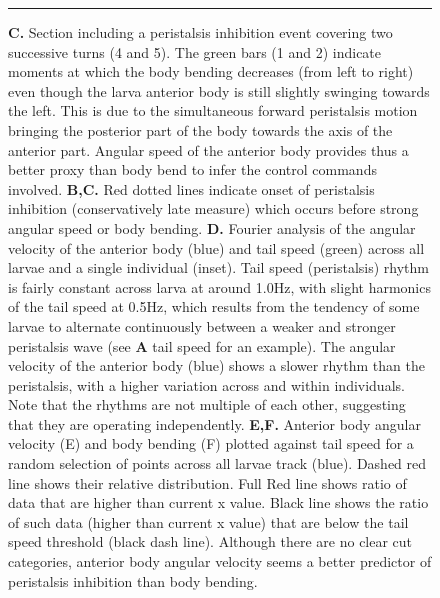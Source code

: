 \documentclass[11pt,a4paper]{article}
\newcommand{\todoBW}[1]{\todo[author=BW,color=orange, size=\tiny,inline]{#1}}
\begin{document}
\begin{figure}
\ContinuedFloat
\caption{
{\bf C.} Section including a peristalsis inhibition event covering two successive turns (4 and 5). The green bars (1 and 2) indicate moments at which the body bending decreases (from left to right) even though the larva anterior body is still slightly swinging towards the left. This is due to the simultaneous forward peristalsis motion bringing the posterior part of the body towards the axis of the anterior part. Angular speed of the anterior body provides thus a better proxy than body bend to infer the control commands involved.
 {\bf B,C.} Red dotted lines indicate onset of peristalsis inhibition (conservatively late measure) which occurs before strong angular speed or body bending. {\bf D.} Fourier analysis of the angular velocity of the anterior body (blue) and tail speed (green) across all larvae and a single individual (inset). Tail speed (peristalsis) rhythm is fairly constant across larva at around 1.0Hz, with slight harmonics of the tail speed at 0.5Hz, which results from the tendency of some larvae to alternate continuously between a weaker and stronger peristalsis wave (see {\bf A} tail speed for an example). The angular velocity of the anterior body (blue) shows a slower rhythm than the peristalsis, with a higher variation across and within individuals. Note that the rhythms are not multiple of each other, suggesting that they are operating independently.
{\bf  E,F.} Anterior body angular velocity (E) and body bending (F) plotted against tail speed for a random selection of points across all larvae track (blue). Dashed red line shows their relative distribution.
 Full Red line shows ratio of data that are higher than current x value. Black line shows the ratio of such data (higher than current x value) that are below the tail speed threshold (black dash line). Although there are no clear cut categories, anterior body angular velocity seems a better predictor of peristalsis inhibition than body bending.
}
\hrule
\end{figure}
\end{document}
